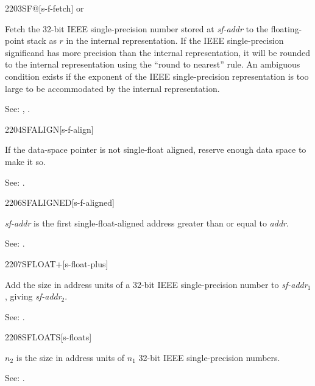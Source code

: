 \begin{newword}{2203}{SF@}[s-f-fetch]
	  or

	Fetch the 32-bit IEEE single-precision number stored at
	\emph{sf-addr} to the floating-point stack as $r$ in the
	internal representation. If the IEEE single-precision
	significand has more precision than the internal representation,
	it will be rounded to the internal representation using the
	``round to nearest'' rule. An ambiguous condition exists if the
	exponent of the IEEE single-precision representation is too
	large to be accommodated by the internal representation.

\item[See:]
	,
	.
\end{newword}


\begin{newword}{2204}{SFALIGN}[s-f-align]
	\stack{}{}

	If the data-space pointer is not single-float aligned, reserve
	enough data space to make it so.

\item[See:]
	.
\end{newword}


\begin{newword}{2206}{SFALIGNED}[s-f-aligned]

	\emph{sf-addr} is the first single-float-aligned address greater
	than or equal to \emph{addr}.

\item[See:]
	.
\end{newword}


\begin{newword}{2207}{SFLOAT+}[s-float-plus]

	Add the size in address units of a 32-bit IEEE single-precision
	number to \emph{sf-addr}$_1$, giving \emph{sf-addr}$_2$.

\item[See:]
	.
\end{newword}


\begin{newword}{2208}{SFLOATS}[s-floats]

	$n_2$ is the size in address units of $n_1$ 32-bit IEEE
	single-precision numbers.

\item[See:]
	.
\end{newword}
